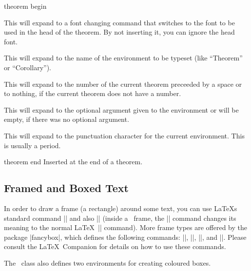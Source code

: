 \begin{element}{theorem begin}
\begin{itemize}
    \iteminsert{\inserttheoremheadfont}
    This will expand to a font changing command that switches to the
    font to be used in the head of the theorem. By not inserting it, you
    can ignore the head font.

    \iteminsert{\inserttheoremname}
    This will expand to the name of the environment to be typeset (like
    ``Theorem'' or ``Corollary'').

    \iteminsert{\inserttheoremnumber}
    This will expand to the number of the current theorem preceeded by a
    space or to nothing, if the current theorem does not have a number.

    \iteminsert{\inserttheoremaddition}
    This will expand to the optional argument given to the environment
    or will be empty, if there was no optional argument.

    \iteminsert{\inserttheorempunctuation}
    This will expand to the punctuation character for the current
    environment. This is usually a period.
  \end{itemize}
\end{element}

\begin{element}{theorem end}\yes\no\no
  Inserted at the end of a theorem.
\end{element}



\subsection{Framed and Boxed Text}

In order to draw a frame (a rectangle) around some text, you can use
\LaTeX s standard command |\fbox| and also |\frame| (inside a \beamer{}, the |\frame| command changes its meaning to the normal \LaTeX\
|\frame| command). More frame types are offered by the
package |fancybox|, which defines the following commands:
|\shadowbox|, |\doublebox|, |\ovalbox|, and |\Ovalbox|. Please consult
the \LaTeX\ Companion for details on how to use these commands.

The \beamer\ class also defines two environments for creating coloured
boxes.

